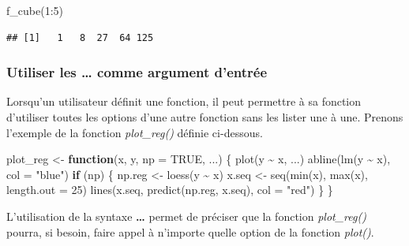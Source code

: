 \documentclass[
]{book}
\newenvironment{Shaded}{\begin{snugshade}}{\end{snugshade}}
\newcommand{\AttributeTok}[1]{\textcolor[rgb]{0.77,0.63,0.00}{#1}}
\newcommand{\ConstantTok}[1]{\textcolor[rgb]{0.00,0.00,0.00}{#1}}
\newcommand{\ControlFlowTok}[1]{\textcolor[rgb]{0.13,0.29,0.53}{\textbf{#1}}}
\newcommand{\DecValTok}[1]{\textcolor[rgb]{0.00,0.00,0.81}{#1}}
\newcommand{\FunctionTok}[1]{\textcolor[rgb]{0.00,0.00,0.00}{#1}}
\newcommand{\NormalTok}[1]{#1}
\newcommand{\OtherTok}[1]{\textcolor[rgb]{0.56,0.35,0.01}{#1}}
\newcommand{\SpecialCharTok}[1]{\textcolor[rgb]{0.00,0.00,0.00}{#1}}
\newcommand{\StringTok}[1]{\textcolor[rgb]{0.31,0.60,0.02}{#1}}
\theoremstyle{definition}
\theoremstyle{definition}
\theoremstyle{definition}
\theoremstyle{definition}
\theoremstyle{remark}
\begin{document}
\begin{Shaded}
\begin{Highlighting}[]
\FunctionTok{f\_cube}\NormalTok{(}\DecValTok{1}\SpecialCharTok{:}\DecValTok{5}\NormalTok{)}
\end{Highlighting}
\end{Shaded}

\begin{verbatim}
## [1]   1   8  27  64 125
\end{verbatim}

\hypertarget{utiliser-les-comme-argument-dentruxe9e}{%
\subsubsection{Utiliser les \ldots{} comme argument d'entrée}\label{utiliser-les-comme-argument-dentruxe9e}}

Lorsqu'un utilisateur définit une fonction, il peut permettre à sa fonction d'utiliser toutes les options d'une autre fonction sans les lister une à une. Prenons l'exemple de la fonction \emph{plot\_reg()} définie ci-dessous.

\begin{Shaded}
\begin{Highlighting}[]
\NormalTok{plot\_reg }\OtherTok{\textless{}{-}} \ControlFlowTok{function}\NormalTok{(x, y, }\AttributeTok{np =} \ConstantTok{TRUE}\NormalTok{, ...) \{}
  \FunctionTok{plot}\NormalTok{(y }\SpecialCharTok{\textasciitilde{}}\NormalTok{ x, ...)}
  \FunctionTok{abline}\NormalTok{(}\FunctionTok{lm}\NormalTok{(y }\SpecialCharTok{\textasciitilde{}}\NormalTok{ x), }\AttributeTok{col =} \StringTok{"blue"}\NormalTok{)}
  \ControlFlowTok{if}\NormalTok{ (np) \{}
\NormalTok{    np.reg }\OtherTok{\textless{}{-}} \FunctionTok{loess}\NormalTok{(y }\SpecialCharTok{\textasciitilde{}}\NormalTok{ x)}
\NormalTok{    x.seq }\OtherTok{\textless{}{-}} \FunctionTok{seq}\NormalTok{(}\FunctionTok{min}\NormalTok{(x), }\FunctionTok{max}\NormalTok{(x), }\AttributeTok{length.out =} \DecValTok{25}\NormalTok{)}
    \FunctionTok{lines}\NormalTok{(x.seq, }\FunctionTok{predict}\NormalTok{(np.reg, x.seq), }\AttributeTok{col =} \StringTok{"red"}\NormalTok{)}
\NormalTok{  \}}
\NormalTok{\}}
\end{Highlighting}
\end{Shaded}

L'utilisation de la syntaxe \textbf{\ldots{}} permet de préciser que la fonction \emph{plot\_reg()} pourra, si besoin, faire appel à n'importe quelle option de la fonction \emph{plot()}.
\end{document}
